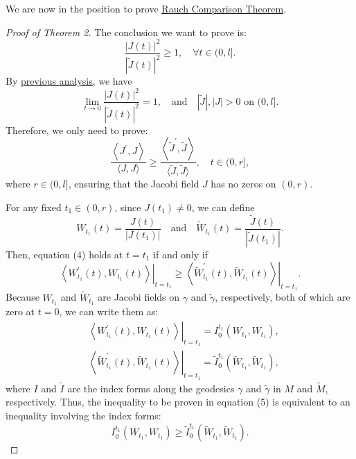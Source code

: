 \documentclass{ctexart}
\begin{document}
We are now in the position to prove \underline{\hyperref[RCT]{Rauch Comparison Theorem}}.
\begin{proof}[Proof of Theorem 2]
  The conclusion we want to prove is:
  $$
  \frac{|J(t)|^2}{|\tilde{J}(t)|^2} \geq 1, \quad \forall t \in (0, l].
  $$
  By \underline{\hyperlink{GSpre}{previous analysis}}, we have 
  $$
  \lim _{t \rightarrow 0} \frac{|J(t)|^2}{|\tilde{J}(t)|^2}=1, \quad \text{and} \quad |\tilde{J}|, |J| > 0 \text{ on } (0, l].
  $$
  Therefore, we only need to prove:
  \begin{equation}
    \frac{\left\langle J^{\prime}, J\right\rangle}{\langle J, J\rangle} \geq \frac{\left\langle\tilde{J}^{\prime}, \tilde{J}\right\rangle}{\langle\tilde{J}, \tilde{J}\rangle}, \quad t \in (0, r],
  \end{equation}
  where $r \in (0, l]$, ensuring that the Jacobi field $J$ has no zeros on $(0, r)$.
  
  For any fixed $t_1 \in (0, r)$, since $J(t_1) \neq 0$, we can define
  $$
  W_{t_1}(t) = \frac{J(t)}{\left|J(t_1)\right|} \quad \text{and} \quad \tilde{W}_{t_1}(t) = \frac{\tilde{J}(t)}{\left|\tilde{J}(t_1)\right|}.
  $$
  Then, equation (4) holds at $t = t_1$ if and only if
  \begin{equation}
    \left.\left\langle W_{t_1}^{\prime}(t), W_{t_1}(t)\right\rangle\right|_{t=t_1} \geq \left.\left\langle\tilde{W}_{t_1}^{\prime}(t), \tilde{W}_{t_1}(t)\right\rangle\right|_{t=t_1}.
  \end{equation}
  Because $W_{t_1}$ and $\tilde{W}_{t_1}$ are Jacobi fields on $\gamma$ and $\tilde{\gamma}$, respectively, both of which are zero at $t = 0$, we can write them as:
  $$
  \begin{aligned}
  & \left.\left\langle W_{t_1}^{\prime}(t), W_{t_1}(t)\right\rangle\right|_{t=t_1}=I_0^{t_1}\left(W_{t_1}, W_{t_1}\right), \\
  & \left.\left\langle\tilde{W}_{t_1}^{\prime}(t), \tilde{W}_{t_1}(t)\right\rangle\right|_{t=t_1}=\tilde{I}_0^{t_1}\left(\tilde{W}_{t_1}, \tilde{W}_{t_1}\right),
  \end{aligned}
  $$
  where $I$ and $\tilde{I}$ are the index forms along the geodesics $\gamma$ and $\tilde{\gamma}$ in $M$ and $\tilde{M}$, respectively. 
  Thus, the inequality to be proven in equation (5) is equivalent to an inequality involving the index forms:
  $$
  I_0^{t_1}\left(W_{t_1}, W_{t_1}\right) \geq \tilde{I}_0^{t_1}\left(\tilde{W}_{t_1}, \tilde{W}_{t_1}\right).
  $$


\end{proof}
\end{document}
